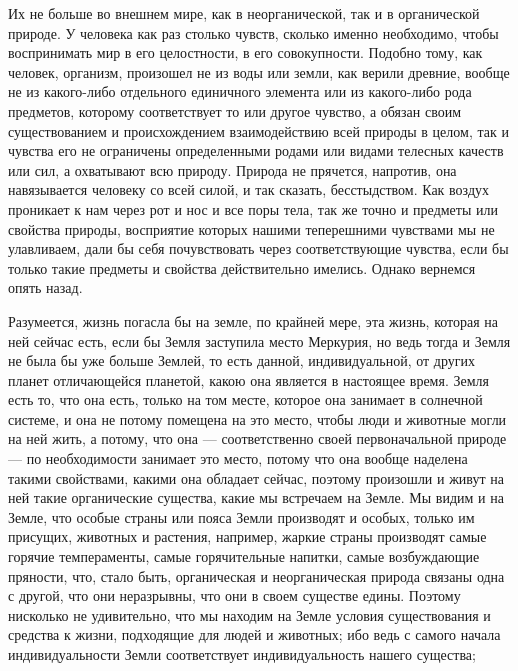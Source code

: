 \documentclass[12pt]{article}
\begin{document}
Их не больше во внешнем мире, как в неорганической, так и в органической природе. У человека как раз столько чувств, сколько именно необходимо, чтобы воспринимать мир в его целостности, в его совокупности. Подобно тому, как человек, организм, произошел не из воды или земли, как верили древние, вообще не из какого-либо отдельного единичного элемента или из какого-либо рода предметов, которому соответствует то или другое чувство, а обязан своим существованием и происхождением взаимодействию всей природы в целом, так и чувства его не ограничены определенными родами или видами телесных качеств или сил, а охватывают всю природу. Природа не прячется, напротив, она навязывается человеку со всей силой, и так сказать, бесстыдством. Как воздух проникает к нам через рот и нос и все поры тела, так же точно и предметы или свойства природы, восприятие которых нашими теперешними чувствами мы не улавливаем, дали бы себя почувствовать через соответствующие чувства, если бы только такие предметы и свойства действительно имелись. Однако вернемся опять назад. 

Разумеется, жизнь погасла бы на земле, по крайней мере, эта жизнь, которая на ней сейчас есть, если бы Земля заступила место Меркурия, но ведь тогда и Земля не была бы уже больше Землей, то есть данной, индивидуальной, от других планет отличающейся планетой, какою она является в настоящее время. Земля есть то, что она есть, только на том месте, которое она занимает в солнечной системе, и она не потому помещена на это место, чтобы люди и животные могли на ней жить, а потому, что она --- соответственно своей первоначальной природе --- по необходимости занимает это место, потому что она вообще наделена такими свойствами, какими она обладает сейчас, поэтому произошли и живут на ней такие органические существа, какие мы встречаем на Земле. Мы видим и на Земле, что особые страны или пояса Земли производят и особых, только им присущих, животных и растения, например, жаркие страны производят самые горячие темпераменты, самые горячительные напитки, самые возбуждающие пряности, что, стало быть, органическая и неорганическая природа связаны одна с другой, что они неразрывны, что они в своем существе едины. Поэтому нисколько не удивительно, что мы находим на Земле условия существования и средства к жизни, подходящие для людей и животных; ибо ведь с самого начала индивидуальности Земли соответствует индивидуальность нашего существа; 
\end{document}
